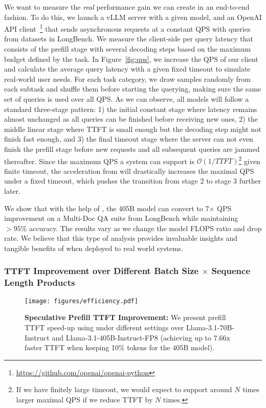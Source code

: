 We want to measure the \textit{real} performance gain we can create in an end-to-end fashion. To do this, we launch a vLLM server with a given model, and an OpenAI API client~\footnote{\url{https://github.com/openai/openai-python}} that sends asynchronous requests at a constant QPS with queries from datasets in LongBench. We measure the client-side per query latency that consists of the prefill stage with several decoding steps based on the maximum budget defined by the task. In Figure~\ref{fig:qps}, we increase the QPS of our client and calculate the  average query latency with a given fixed timeout to simulate real-world user needs. For each task category, we draw samples randomly from each subtask and shuffle them before starting the querying, making sure the same set of queries is used over all QPS. As we can observe, all models will follow a standard three-stage pattern: 1) the initial constant stage where latency remains almost unchanged as all queries can be finished before receiving new ones, 2) the middle linear stage where TTFT is small enough but the decoding step might not finish fast enough, and 3) the final timeout stage where the server can not even finish the prefill stage before new requests and all subsequent queries are jammed thereafter. Since the maximum QPS a system can support is $\mathcal{O}(1/TTFT)$\footnote{If we have finitely large timeout, we would expect \ours{} to support around $N$ times larger maximal QPS if we reduce TTFT by $N$ times.} given finite timeout, the acceleration from \ours{} will drastically increases the maximal QPS under a fixed timeout, which pushes the transition from stage 2 to stage 3 further later. 
    
We show that with the help of \ours{}, the 405B model can convert to 7$\times$ QPS improvement on a Multi-Doc QA suite from LongBench while maintaining $>95\%$ accuracy. The results vary as we change the model FLOPS ratio and drop rate. We believe that this type of analysis provides invaluable insights and tangible benefits of \ours{} when deployed to real world systems. 
    
\subsubsection{TTFT Improvement over Different Batch Size $\times$ Sequence Length Products}  

\begin{figure}[]
\begin{center}
\centerline{\texttt{[image: figures/efficiency.pdf]}}
\vskip -0.1in
\caption{\textbf{Speculative Prefill TTFT Improvement:} We present prefill TTFT speed-up using \ours{} under different settings over Llama-3.1-70B-Instruct and Llama-3.1-405B-Instruct-FP8 (achieving up to 7.66x faster TTFT when keeping 10\% tokens for the 405B model). }
\label{fig:efficiency}
\end{center}
\vskip -0.2in
\end{figure}

